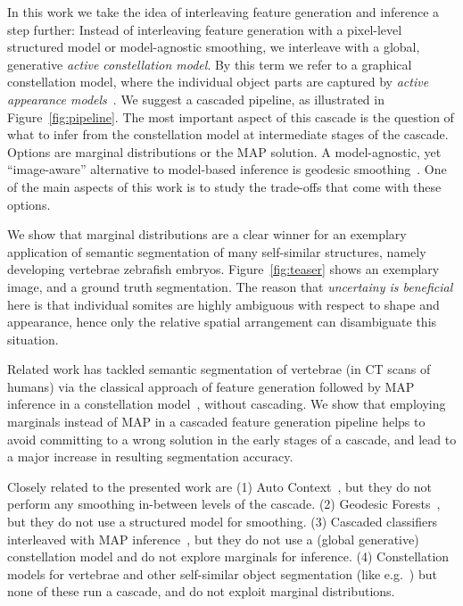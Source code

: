 \documentclass[10pt,twocolumn,letterpaper]{article}
\begin{document}
In this work we take the idea of interleaving feature generation and inference a step further: 
%
Instead of interleaving feature generation with a pixel-level structured model or model-agnostic smoothing, we interleave with a global, generative \emph{active constellation model}. By this term we refer to a graphical constellation model, where the individual object parts are captured by \emph{active appearance models}~\cite{CootesAAM2001}. 
%
We suggest a cascaded pipeline, as illustrated in Figure~\ref{fig:pipeline}. 
% 
The most important aspect of this cascade is the question of what to infer from the constellation model at intermediate stages of the cascade. 
%
Options are marginal distributions or the MAP solution. A model-agnostic, yet ``image-aware'' alternative to model-based inference is geodesic smoothing~\cite{GeoForests2013}. 
%
One of the main aspects of this work is to study the trade-offs that come with these options. 

We show that marginal distributions are a clear winner for an exemplary application of semantic segmentation of many self-similar structures, namely developing vertebrae zebrafish embryos. Figure~\ref{fig:teaser} shows an exemplary image, and a ground truth segmentation. 
%
The reason that \emph{uncertainy is beneficial} here is that individual somites are highly ambiguous with respect to shape and appearance, hence only the relative spatial arrangement can disambiguate this situation. 

Related work has tackled semantic segmentation of vertebrae (in CT scans of humans) via the classical approach of feature generation followed by MAP inference in a constellation model~\cite{Glocker2013}, without cascading. 
%
We show that employing marginals instead of MAP in a cascaded feature generation pipeline helps to avoid committing to a wrong solution in the early stages of a cascade, and lead to a major increase in resulting segmentation accuracy. 

Closely related to the presented work are 
(1) Auto Context~\cite{AutoContext2008}, but they do not perform any smoothing in-between levels of the cascade. 
(2) Geodesic Forests~\cite{GeoForests2013}, but they do not use a structured model for smoothing. 
(3) Cascaded classifiers interleaved with MAP inference~\cite{DTF,RTF,UweCVPR2013}, but they do not use a (global generative) constellation model and do not explore marginals for inference. 
(4) Constellation models for vertebrae and other self-similar object segmentation (like e.g.\ \cite{Glocker2012,Glocker2013,Klinder2009471,TeethMICCAI2012,WormMiccai2014}) but none of these run a cascade, and do not exploit marginal distributions. 
\end{document}
